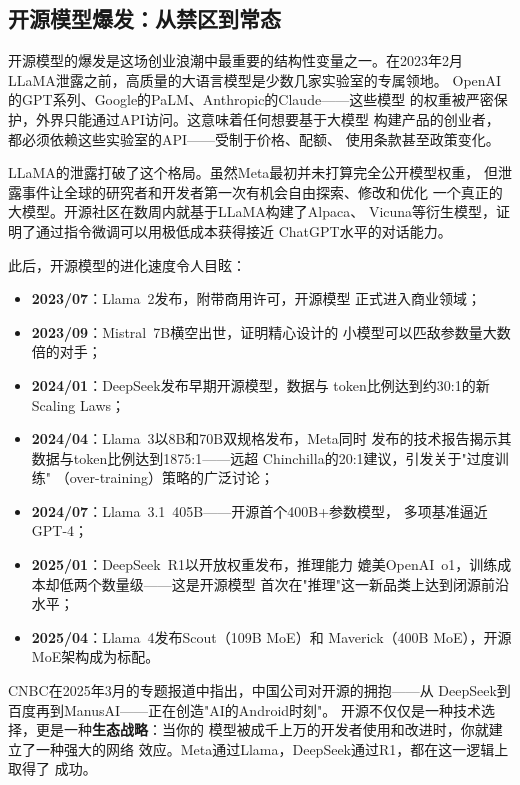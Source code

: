 \subsection{开源模型爆发：从禁区到常态}

开源模型的爆发是这场创业浪潮中最重要的结构性变量之一。在2023年2月
LLaMA泄露之前，高质量的大语言模型是少数几家实验室的专属领地。
OpenAI的GPT系列、Google的PaLM、Anthropic的Claude——这些模型
的权重被严密保护，外界只能通过API访问。这意味着任何想要基于大模型
构建产品的创业者，都必须依赖这些实验室的API——受制于价格、配额、
使用条款甚至政策变化。

LLaMA的泄露打破了这个格局。虽然Meta最初并未打算完全公开模型权重，
但泄露事件让全球的研究者和开发者第一次有机会自由探索、修改和优化
一个真正的大模型。开源社区在数周内就基于LLaMA构建了Alpaca、
Vicuna等衍生模型，证明了通过指令微调可以用极低成本获得接近
ChatGPT水平的对话能力。

此后，开源模型的进化速度令人目眩：

\begin{itemize}
  \item \textbf{2023/07}：Llama~2发布，附带商用许可，开源模型
    正式进入商业领域；
  \item \textbf{2023/09}：Mistral~7B横空出世，证明精心设计的
    小模型可以匹敌参数量大数倍的对手；
  \item \textbf{2024/01}：DeepSeek发布早期开源模型，数据与
    token比例达到约30:1的新Scaling Laws；
  \item \textbf{2024/04}：Llama~3以8B和70B双规格发布，Meta同时
    发布的技术报告揭示其数据与token比例达到1875:1——远超
    Chinchilla的20:1建议，引发关于"过度训练"
    （over-training）策略的广泛讨论；
  \item \textbf{2024/07}：Llama~3.1~405B——开源首个400B+参数模型，
    多项基准逼近GPT-4；
  \item \textbf{2025/01}：DeepSeek~R1以开放权重发布，推理能力
    媲美OpenAI~o1，训练成本却低两个数量级——这是开源模型
    首次在"推理"这一新品类上达到闭源前沿水平；
  \item \textbf{2025/04}：Llama~4发布Scout（109B MoE）和
    Maverick（400B MoE），开源MoE架构成为标配。
\end{itemize}

CNBC在2025年3月的专题报道中指出，中国公司对开源的拥抱——从
DeepSeek到百度再到ManusAI——正在创造"AI的Android时刻"。
开源不仅仅是一种技术选择，更是一种\textbf{生态战略}：当你的
模型被成千上万的开发者使用和改进时，你就建立了一种强大的网络
效应。Meta通过Llama，DeepSeek通过R1，都在这一逻辑上取得了
成功。

